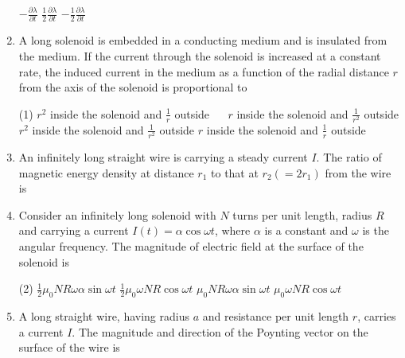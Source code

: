 \begin{enumerate}
\begin{tasks}
		\task[\textbf{B.}]$-\frac{\partial \lambda}{\partial t}$
		\task[\textbf{C.}]$\frac{1}{2} \frac{\partial \lambda}{\partial t}$
		\task[\textbf{D.}]$-\frac{1}{2} \frac{\partial \lambda}{\partial t}$
	\end{tasks}
	\item A long solenoid is embedded in a conducting medium and is insulated from the medium. If the current through the solenoid is increased at a constant rate, the induced current in the medium as a function of the radial distance $r$ from the axis of the solenoid is proportional to
	{}
	\begin{tasks}(1)
		\task[\textbf{A.}] $r^{2}$ inside the solenoid and $\frac{1}{r}$ outside $\quad$  
		\task[\textbf{B.}]$r$ inside the solenoid and $\frac{1}{r^{2}}$ outside
		\task[\textbf{C.}] $r^{2}$ inside the solenoid and $\frac{1}{r^{2}}$ outside
		\task[\textbf{D.}]$r$ inside the solenoid and $\frac{1}{r}$ outside
	\end{tasks}
	\item An infinitely long straight wire is carrying a steady current $I$. The ratio of magnetic energy density at distance $r_{1}$ to that at $r_{2}\left(=2 r_{1}\right)$ from the wire is
	{	}
	\item Consider an infinitely long solenoid with $N$ turns per unit length, radius $R$ and carrying a current $I(t)=\alpha \cos \omega t$, where $\alpha$ is a constant and $\omega$ is the angular frequency. The magnitude of electric field at the surface of the solenoid is
	{	}
	\begin{tasks}(2)
		\task[\textbf{A.}] $\frac{1}{2} \mu_{0} N R \omega \alpha \sin \omega t$
		\task[\textbf{B.}]$\frac{1}{2} \mu_{0} \omega N R \cos \omega t$
		\task[\textbf{C.}]$\mu_{0} N R \omega \alpha \sin \omega t$
		\task[\textbf{D.}]$\mu_{0} \omega N R \cos \omega t$
	\end{tasks}
	
	\item A long straight wire, having radius $a$ and resistance per unit length $r$, carries a current $I$. The magnitude and direction of the Poynting vector on the surface of the wire is
	{}
	

\end{enumerate}

